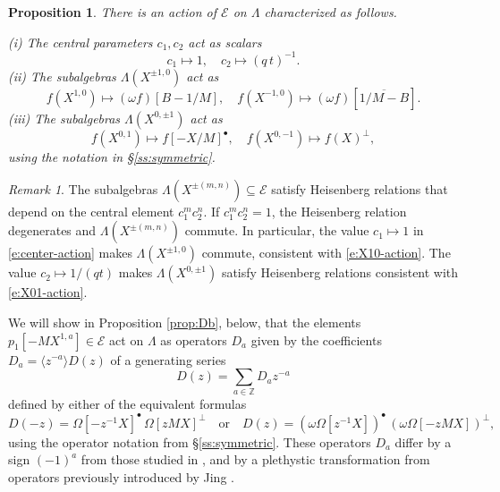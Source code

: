 \documentclass[12pt]{amsart}
\newtheorem{prop}[thm]{Proposition}
\theoremstyle{definition}
\theoremstyle{remark}
\newtheorem{remark}[thm]{Remark}
\newcommand{\ZZ}{{\mathbb Z}}
\newcommand{\Ecal}{{\mathcal E}}
\begin{document}
\begin{prop}\label{prop:E-action}
There is an action of $\Ecal $ on $\Lambda $ characterized as follows.

\noindent
(i) The central parameters $c_{1},c_{2}$ act as scalars
\begin{equation}\label{e:center-action}
c_{1}\mapsto 1,\quad c_{2}\mapsto (q\, t)^{-1}.
\end{equation}
(ii) The subalgebras $\Lambda (X^{\pm 1,0})$ act as
\begin{equation}\label{e:X10-action}
f(X^{1,0})\mapsto (\omega f)[B-1/M],\quad f(X^{-1,0})\mapsto (\omega
f)[\overline{1/M-B}].
\end{equation}
(iii) The subalgebras $\Lambda (X^{0,\pm 1})$ act as
\begin{equation}\label{e:X01-action}
f(X^{0,1})\mapsto f[-X/M]^{\bullet },\quad f(X^{0,-1})\mapsto f(X)^{\perp },
\end{equation}
using the notation in \S \ref{ss:symmetric}.
\end{prop}

\begin{remark}\label{rem:Heisenberg}
The subalgebras $\Lambda (X^{\pm (m,n)})\subseteq \Ecal $ satisfy
Heisenberg relations that depend on the central element
$c_{1}^{m}c_{2}^{n}$.  If $c_{1}^{m}c_{2}^{n} = 1$, the Heisenberg
relation degenerates and $\Lambda (X^{\pm (m,n)})$ commute.  In
particular, the value $c_{1} \mapsto 1$ in \eqref{e:center-action}
makes $\Lambda (X^{\pm 1,0})$ commute, consistent with
\eqref{e:X10-action}.  The value $c_{2}\mapsto 1/(qt)$ makes $\Lambda
(X^{0,\pm 1})$ satisfy Heisenberg relations consistent with
\eqref{e:X01-action}.
\end{remark}

We will show in Proposition \ref{prop:Db}, below, that the elements
$p_{1}[-MX^{1,a}]\in \Ecal $ act on $\Lambda $ as operators $D_{a}$
given by the coefficients $D_{a} = \langle z^{-a} \rangle D(z)$ of a
generating series
\begin{equation}\label{e:Db}
D(z) = \sum _{a\in \ZZ } D_{a} z^{-a}
\end{equation}
defined by either of the equivalent formulas
\begin{equation}\label{e:Dz}
D(-z) = \Omega [-z^{-1}X]^{\bullet } \, \Omega [z M X]^{\perp }\quad
\text{or}\quad D(z) = (\omega \Omega [z^{-1}X])^{\bullet }\, (\omega
\Omega [-z M X])^{\perp },
\end{equation}
using the operator notation from \S \ref{ss:symmetric}.  These
operators $D_{a}$ differ by a sign $(-1)^{a}$ from those studied in
\cite{BeGaHaTe99,GaHaTe99}, and by a plethystic transformation from
operators previously introduced by Jing \cite{Jing94}.
\end{document}
